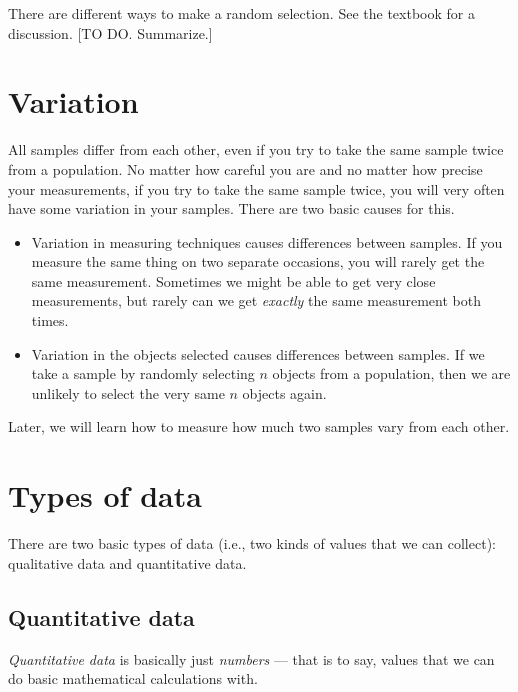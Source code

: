 \documentclass[../../../main.tex]{subfiles}
\begin{document}
There are different ways to make a random selection. See the textbook for a discussion. [TO DO. Summarize.]


\section{Variation}

All samples differ from each other, even if you try to take the same sample twice from a population. No matter how careful you are and no matter how precise your measurements, if you try to take the same sample twice, you will very often have some variation in your samples. There are two basic causes for this.

\begin{itemize}

  \item Variation in measuring techniques causes differences between samples. If you measure the same thing on two separate occasions, you will rarely get the same measurement. Sometimes we might be able to get very close measurements, but rarely can we get \emph{exactly} the same measurement both times.
  
  \item Variation in the objects selected causes differences between samples. If we take a sample by randomly selecting $n$ objects from a population, then we are unlikely to select the very same $n$ objects again. 

\end{itemize}

Later, we will learn how to measure how much two samples vary from each other.


\section{Types of data}

There are two basic types of data (i.e., two kinds of values that we can collect): qualitative data and quantitative data.


\subsection{Quantitative data}

\emph{Quantitative data} is basically just \emph{numbers} --- that is to say, values that we can do basic mathematical calculations with. 
  
\end{document}
